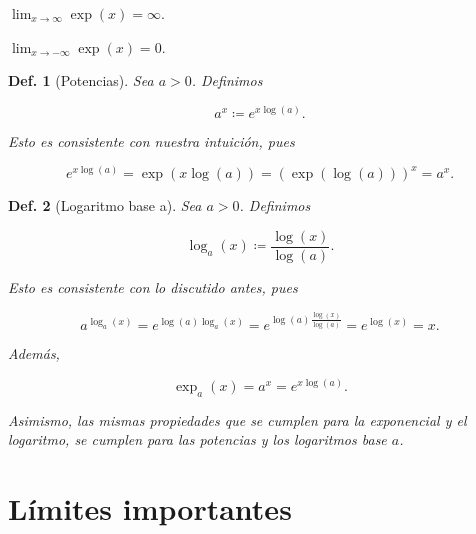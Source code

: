 \documentclass{article}
\theoremstyle{definicion}
\newtheorem{definicion}{Def.}
\theoremstyle{definition}             %
\theoremstyle{definition}             %
\theoremstyle{definition}
\theoremstyle{definition}
\theoremstyle{observacion}
\theoremstyle{definition}
\theoremstyle{plain}
\theoremstyle{definition}
\theoremstyle{afirmacion}
\theoremstyle{definition}
\begin{document}
    \begin{aff}
        \(\lim_{x\to\infty} \exp(x) = \infty\).
    \end{aff}

    \begin{aff}
        \(\lim_{x\to -\infty} \exp(x) = 0\).
    \end{aff}

    \begin{definicion}[Potencias]
        Sea \(a > 0\). Definimos

        \begin{equation*}
            a^{x} \coloneq e^{x\log(a)}.
        \end{equation*}

        Esto es consistente con nuestra intuición, pues 

        \begin{equation*}
            e^{x\log(a)} = \exp(x\log(a)) = (\exp(\log(a)))^{x} = a^{x}.
        \end{equation*}
    \end{definicion}

    \begin{definicion}[Logaritmo base a]
        Sea \(a > 0\). Definimos 
        
        \begin{equation*}
            \log_{a}(x) \coloneq \dfrac{\log(x)}{\log(a)}.
        \end{equation*}

        Esto es consistente con lo discutido antes, pues

        \begin{equation*}
            a^{\log_{a}(x)} = e^{\log(a)\log_{a}(x)} = e^{\log(a)\frac{\log(x)}{\log(a)}} = e^{\log(x)} = x.
        \end{equation*}

        Además,

        \begin{equation*}
            \exp_{a}(x) = a^{x} = e^{x\log(a)}.
        \end{equation*}

        Asimismo, las mismas propiedades que se cumplen para la exponencial y el logaritmo, se cumplen para las potencias y los logaritmos base \(a\).
    \end{definicion}

    \section{Límites importantes}
\end{document}
